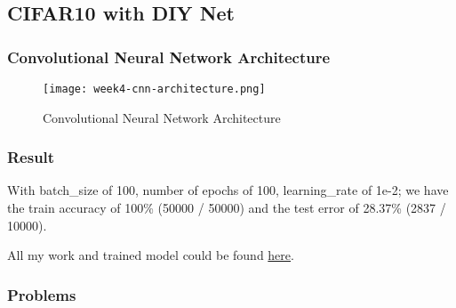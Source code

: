 \newpage
\subsection{CIFAR10 with DIY Net}
\subsubsection{Convolutional Neural Network Architecture}
\begin{figure}[!ht]
\centering
\texttt{[image: week4-cnn-architecture.png]}
\caption{Convolutional Neural Network Architecture}
\end{figure}

\subsubsection{Result}
With batch\_size of 100, number of epochs of 100, learning\_rate of 1e-2; we have the train accuracy of 100\% (50000 / 50000) and the test error of 28.37\% (2837 / 10000).

All my work and trained model could be found \href{https://gitlab.com/tlvu2697/image-classification-cifar10}{here}.

\subsubsection{Problems}